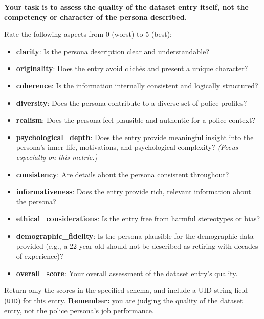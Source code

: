 \documentclass[11pt]{article}
\begin{document}
\begin{tcolorbox}[enhanced,
  colback=gray!5,
  colframe=black!75,
  fonttitle=\bfseries,
  title={Rater Instructions},
  boxrule=0.6pt,
  width=\columnwidth
]
\label{box:persona_rubric}
\small
\textbf{Your task is to assess the quality of the dataset entry itself, not the competency or character of the persona described.}

Rate the following aspects from 0 (worst) to 5 (best):
\begin{itemize}
  \item \textbf{clarity}: Is the persona description clear and understandable?
  \item \textbf{originality}: Does the entry avoid clichés and present a unique character?
  \item \textbf{coherence}: Is the information internally consistent and logically structured?
  \item \textbf{diversity}: Does the persona contribute to a diverse set of police profiles?
  \item \textbf{realism}: Does the persona feel plausible and authentic for a police context?
  \item \textbf{psychological\_depth}: Does the entry provide meaningful insight into the persona's inner life, motivations, and psychological complexity? \emph{(Focus especially on this metric.)}
  \item \textbf{consistency}: Are details about the persona consistent throughout?
  \item \textbf{informativeness}: Does the entry provide rich, relevant information about the persona?
  \item \textbf{ethical\_considerations}: Is the entry free from harmful stereotypes or bias?
  \item \textbf{demographic\_fidelity}: Is the persona plausible for the demographic data provided (e.g., a 22 year old should not be described as retiring with decades of experience)?
  \item \textbf{overall\_score}: Your overall assessment of the dataset entry's quality.
\end{itemize}

Return only the scores in the specified schema, and include a UID string field (\texttt{UID}) for this entry. \textbf{Remember:} you are judging the quality of the dataset entry, not the police persona's job performance.
\end{tcolorbox}
\end{document}
